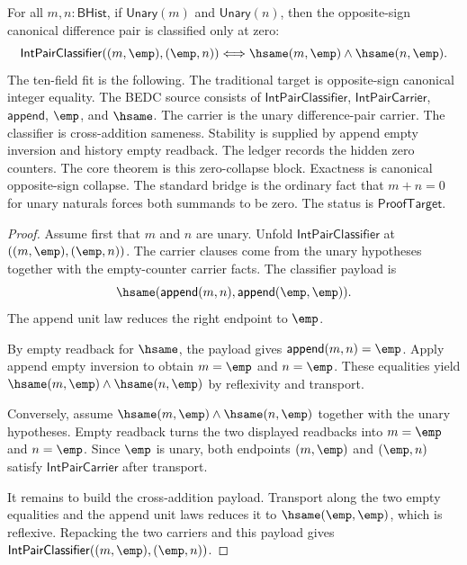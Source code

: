 \begin{theorem}
\label{thm:int-canonical-opposite-sign-zero-collapse}
For all $m,n:\mathsf{BHist}$, if $\mathsf{Unary}(m)$ and
$\mathsf{Unary}(n)$, then the opposite-sign canonical difference pair is
classified only at zero:
$$
\mathsf{IntPairClassifier}((m,\emp),(\emp,n))
\Longleftrightarrow
\hsame(m,\emp)\land\hsame(n,\emp).
$$
The ten-field fit is the following. The traditional target is opposite-sign
canonical integer equality. The BEDC source consists of
$\mathsf{IntPairClassifier}$, $\mathsf{IntPairCarrier}$, $\mathsf{append}$,
$\emp$, and $\hsame$. The carrier is the unary difference-pair carrier. The
classifier is cross-addition sameness. Stability is supplied by append empty
inversion and history empty readback. The ledger records the hidden zero
counters. The core theorem is this zero-collapse block. Exactness is
canonical opposite-sign collapse. The standard bridge is the ordinary fact
that $m+n=0$ for unary naturals forces both summands to be zero. The status is
$\mathsf{ProofTarget}$.
\end{theorem}
\begin{proof}
Assume first that $m$ and $n$ are unary. Unfold
$\mathsf{IntPairClassifier}$ at $((m,\emp),(\emp,n))$. The carrier clauses
come from the unary hypotheses together with the empty-counter carrier facts.
The classifier payload is
$$
\hsame(\mathsf{append}(m,n),\mathsf{append}(\emp,\emp)).
$$
The append unit law reduces the right endpoint to $\emp$.

By empty readback for $\hsame$, the payload gives
$\mathsf{append}(m,n)=\emp$. Apply append empty inversion to obtain
$m=\emp$ and $n=\emp$. These equalities yield
$\hsame(m,\emp)\land\hsame(n,\emp)$ by reflexivity and transport.

Conversely, assume $\hsame(m,\emp)\land\hsame(n,\emp)$ together with the
unary hypotheses. Empty readback turns the two displayed readbacks into
$m=\emp$ and $n=\emp$. Since $\emp$ is unary, both endpoints
$(m,\emp)$ and $(\emp,n)$ satisfy $\mathsf{IntPairCarrier}$ after transport.

It remains to build the cross-addition payload. Transport along the two empty
equalities and the append unit laws reduces it to $\hsame(\emp,\emp)$, which
is reflexive. Repacking the two carriers and this payload gives
$\mathsf{IntPairClassifier}((m,\emp),(\emp,n))$.
\end{proof}

